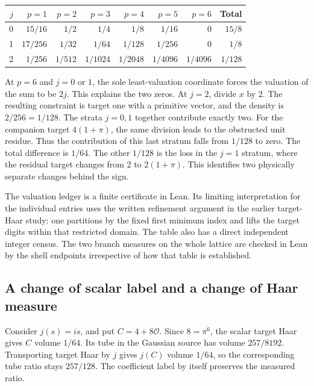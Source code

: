 \documentclass[12pt,letterpaper]{article}
\begin{document}
\begin{center}
\small
\begin{tabular}{@{}r r r r r r r r@{}}
\toprule
\(j\) & \(p=1\) & \(p=2\) & \(p=3\) & \(p=4\) & \(p=5\) & \(p=6\) & Total \\
\midrule
0 & \(15/16\) & \(1/2\) & \(1/4\) & \(1/8\) & \(1/16\) & \(0\) & \(15/8\)\\
1 & \(17/256\) & \(1/32\) & \(1/64\) & \(1/128\) & \(1/256\) & \(0\) & \(1/8\)\\
2 & \(1/256\) & \(1/512\) & \(1/1024\) & \(1/2048\) & \(1/4096\) & \(1/4096\) & \(1/128\)\\
\bottomrule
\end{tabular}
\end{center}

At \(p=6\) and \(j=0\) or \(1\), the sole least-valuation coordinate forces the valuation of the sum to be \(2j\). This explains the two zeros. At \(j=2\), divide \(x\) by \(2\). The resulting constraint is target one with a primitive vector, and the density is \(2/256=1/128\). The strata \(j=0,1\) together contribute exactly two. For the companion target \(4(1+\pi)\), the same division leads to the obstructed unit residue. Thus the contribution of this last stratum falls from \(1/128\) to zero. The total difference is \(1/64\). The other \(1/128\) is the loss in the \(j=1\) stratum, where the residual target changes from \(2\) to \(2(1+\pi)\). This identifies two physically separate changes behind the sign.

The valuation ledger is a finite certificate in Lean. Its limiting interpretation for the individual entries uses the written refinement argument in the earlier target-Haar study: one partitions by the fixed first minimum index and lifts the target digits within that restricted domain. The table also has a direct independent integer census. The two branch measures on the whole lattice are checked in Lean by the shell endpoints irrespective of how that table is established.

\subsection{A change of scalar label and a change of Haar measure}
Consider \(j(s)=is\), and put \(C=4+8\mathcal O\). Since \(8=\pi^6\), the scalar target Haar gives \(C\) volume \(1/64\). Its tube in the Gaussian source has volume \(257/8192\). Transporting target Haar by \(j\) gives \(j(C)\) volume \(1/64\), so the corresponding tube ratio stays \(257/128\). The coefficient label by itself preserves the measured ratio.
\end{document}
